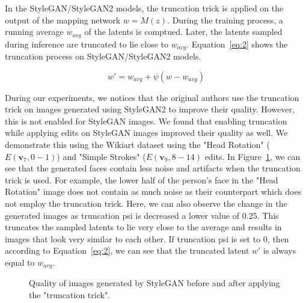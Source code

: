 In the StyleGAN/StyleGAN2 models, the truncation trick is applied on the output of the mapping network $w = M(z)$. During the training process, a running average $w_{avg}$ of the latents is comptued. Later, the latents sampled during inference are truncated to lie close to $w_{avg}$. Equation~\ref{eq:2} shows the truncation process on StyleGAN/StyleGAN2 models.

\begin{equation}
    w' = w_{avg} + \psi (w - w_{avg})
    \label{eq:2}
\end{equation}

During our experiments, we notices that the original authors use the truncation trick on images generated using StyleGAN2 to improve their quality. However, this is not enabled for StyleGAN images. We found that enabling truncation while applying edits on StyleGAN images improved their quality as well. We demonstrate this using the Wikiart dataset using the "Head Rotation" ($E(\textbf{v}_{7}, 0-1)$) and "Simple Strokes" ($E(\textbf{v}_{9}, 8-14)$ edits. In Figure~\ref{fig:truncation_psi}, we can see that the generated faces contain less noise and artifacts when the truncation trick is used. For example, the lower half of the person's face in the "Head Rotation" image does not contain as much noise as their counterpart which does not employ the truncation trick. Here, we can also observe the change in the generated images as truncation psi is decreased a lower value of $0.25$. This truncates the sampled latents to lie very close to the average and results in images that look very similar to each other. If truncation psi is set to $0$, then according to Equation~\ref{eq:2}, we can see that the truncated latent $w'$ is always equal to $w_{avg}$.

\begin{figure}




\caption{Quality of images generated by StyleGAN before and after applying the "truncation trick".}
\label{fig:truncation_psi}
\end{figure}

